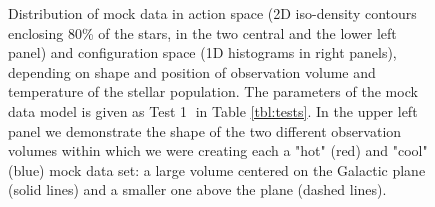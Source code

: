 

\begin{figure}[H]
\caption{Distribution of mock data in action space (2D iso-density contours enclosing 80\% of the stars, in the two central and the lower left panel) and configuration space (1D histograms in right panels), depending on shape and position of observation volume and temperature of the stellar population. The parameters of the mock data model is given as Test \textcircled{1} in Table \ref{tbl:tests}. In the upper left panel we demonstrate the shape of the two different observation volumes within which we were creating each a "hot" (red) and "cool" (blue) mock data set: a large volume centered on the Galactic plane (solid lines) and a smaller one above the plane (dashed lines).} 
\label{fig:mockdatadistr}
\end{figure}
%

